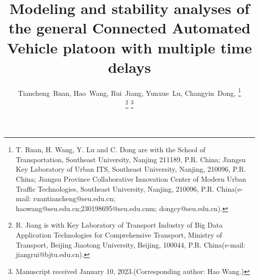 \documentclass[journal]{IEEEtran}
\begin{document}
%
\title{Modeling and stability analyses of the general Connected Automated Vehicle platoon with multiple time delays}
%
%
%

\author{Tiancheng~Ruan,
        Hao~Wang,
        Rui~Jiang,
        Yunxue~Lu,
        Changyin~Dong,
\thanks{T. Ruan,  H. Wang, Y. Lu and C. Dong are with the
School of Transportation, Southeast University, Nanjing 211189, P.R. China;
Jiangsu Key Laboratory of Urban ITS, Southeast University, Nanjing, 210096, P.R. China;
Jiangsu Province Collaborative Innovation Center of Modern Urban Traffic Technologies, Southeast University, Nanjing, 210096, P.R. China(e-mail: ruantiancheng@seu.edu.cn;  haowang@seu.edu.cn;230198695@seu.edu.cnm;
dongcy@seu.edu.cn).}%

\thanks{R. Jiang is with Key Laboratory of Transport Industry of Big Data Application Technologies for Comprehensive Transport, Ministry of Transport, Beijing Jiaotong University, Beijing, 100044, P.R. China(e-mail: jiangrui@bjtu.edu.cn).}
\thanks{Manuscript received January 10, 2023.(Corresponding author: Hao Wang.)}}

% 
%
\end{document}
